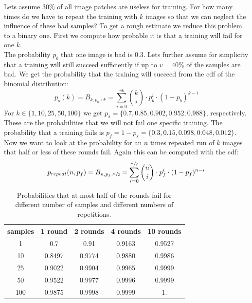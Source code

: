 Lets assume 30\% of all image patches are useless for training. For how many times do we have to repeat the training with $k$ images so that we can neglect the influence of these bad samples? To get a rough estimate we reduce this problem to a binary one. First we compute how probable it is that a training will fail for one $k$.\\
The probability $p_b$ that one image is bad is $0.3$. Lets further assume for simplicity that a training will still succeed sufficiently if up to $v = 40\%$ of the samples are bad. We get the probability that the training will succeed from the \gls{cdf} of the binomial distribution:
\begin{equation}
    p_s(k) = B_{k,p_b, v k} = \sum_{i=0}^{v k} \binom{k}{i}\cdot p_b^i \cdot (1 - p_b)^{k - i}
\end{equation}
For $k\in\{1, 10, 25, 50, 100\}$ we get $p_s = \{\num{0.7},\num{0.85},\num{0.902},\num{0.952},\num{0.988}\}$, respectively. These are the probabilities that we will not fail one specific training. The probability that a training fails is $p_f = 1 - p_s = \{\num{0.3},\num{0.15},\num{0.098},\num{0.048},\num{0.012}\}$. Now we want to look at the probability for an $n$ times repeated run of $k$ images that half or less of these rounds fail. Again this can be computed with the \gls{cdf}:
\begin{equation}
    p_{repeat}(n,p_f) = B_{n,p_f, \sfrac{n}{2}} = \sum_{i=0}^{\sfrac{n}{2}} \binom{n}{i}\cdot p_f^i \cdot (1 - p_f)^{n - i}
\end{equation}

\begin{table}
	\begin{center}
            \begin{tabular}{c|*{4}{c}}
                samples & 1 round & 2 rounds & 4 rounds & 10 rounds \\ \hline \rule{0pt}{3ex}
                1   & 0.7    &  0.91   &  0.9163 &  0.9527 \\
                10  & 0.8497 &  0.9774 &  0.9880 &  0.9986 \\
                25  & 0.9022 &  0.9904 &  0.9965 &  0.9999  \\
                50  & 0.9522 &  0.9977 &  0.9996 &  0.9999 \\
                100 & 0.9875 &  0.9998 &  0.9999 &  1.
            \end{tabular}
	\end{center}
    \caption{Probabilities that at most half of the rounds fail for different number of samples and different numbers of repetitions.}
    \label{tab:repeated_test_probs}
\end{table}

